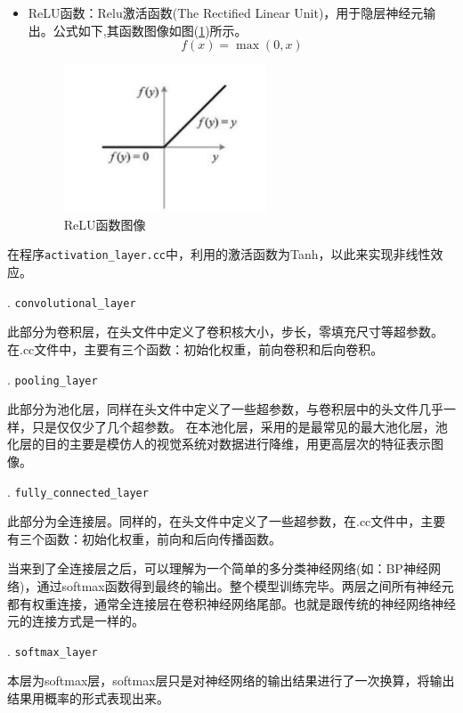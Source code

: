 \documentclass[UTF-8, a4paper, 12pt]{ctexart}
\begin{document}
\begin{itemize}
    \item ReLU函数：Relu激活函数(The Rectified Linear Unit)，用于隐层神经元输出。公式如下,其函数图像如图(\ref{relu})所示。\begin{equation}
        f(x)=\max(0,x)
    \end{equation}
    \begin{figure}[htbp]
        \centering
        \includegraphics[width=6cm]{fig/relu.jpg}
        \caption{ReLU函数图像}
        \label{relu}
    \end{figure}
\end{itemize}

在程序\colorbox[gray]{0.9}{\texttt{activation\_layer.cc}}中，利用的激活函数为Tanh，以此来实现非线性效应。


. \colorbox[gray]{0.9}{\texttt{convolutional\_layer}}

此部分为卷积层，在头文件中定义了卷积核大小，步长，零填充尺寸等超参数。在.cc文件中，主要有三个函数：初始化权重，前向卷积和后向卷积。

. \colorbox[gray]{0.9}{\texttt{pooling\_layer}}

此部分为池化层，同样在头文件中定义了一些超参数，与卷积层中的头文件几乎一样，只是仅仅少了几个超参数。
在本池化层，采用的是最常见的最大池化层，池化层的目的主要是模仿人的视觉系统对数据进行降维，用更高层次的特征表示图像。



. \colorbox[gray]{0.9}{\texttt{fully\_connected\_layer}}

此部分为全连接层。同样的，在头文件中定义了一些超参数，在.cc文件中，主要有三个函数：初始化权重，前向和后向传播函数。

当来到了全连接层之后，可以理解为一个简单的多分类神经网络(如：BP神经网络)，通过softmax函数得到最终的输出。整个模型训练完毕。两层之间所有神经元都有权重连接，通常全连接层在卷积神经网络尾部。也就是跟传统的神经网络神经元的连接方式是一样的。

. \colorbox[gray]{0.9}{\texttt{softmax\_layer}}

本层为softmax层，softmax层只是对神经网络的输出结果进行了一次换算，将输出结果用概率的形式表现出来。
\end{document}
